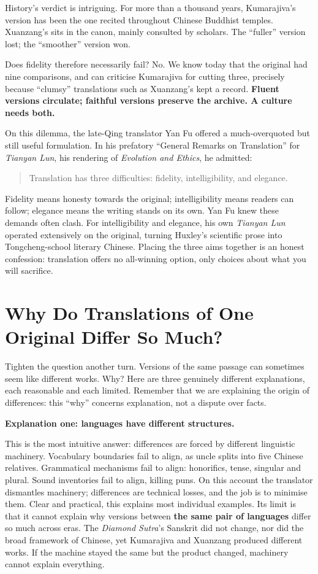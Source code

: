 History's verdict is intriguing. For more than a thousand years, Kumarajiva's version has been the one recited throughout Chinese Buddhist temples. Xuanzang's sits in the canon, mainly consulted by scholars. The ``fuller'' version lost; the ``smoother'' version won.

Does fidelity therefore necessarily fail? No. We know today that the original had nine comparisons, and can criticise Kumarajiva for cutting three, precisely because ``clumsy'' translations such as Xuanzang's kept a record. \textbf{Fluent versions circulate; faithful versions preserve the archive. A culture needs both.}

On this dilemma, the late-Qing translator Yan Fu offered a much-overquoted but still useful formulation. In his prefatory ``General Remarks on Translation'' for \emph{Tianyan Lun}, his rendering of \emph{Evolution and Ethics}, he admitted:

\begin{quote}
Translation has three difficulties: fidelity, intelligibility, and elegance.
\end{quote}
Fidelity means honesty towards the original; intelligibility means readers can follow; elegance means the writing stands on its own. Yan Fu knew these demands often clash. For intelligibility and elegance, his own \emph{Tianyan Lun} operated extensively on the original, turning Huxley's scientific prose into Tongcheng-school literary Chinese. Placing the three aims together is an honest confession: translation offers no all-winning option, only choices about what you will sacrifice.

\section[Why Do Translations Differ?]{Why Do Translations of One Original Differ So Much?}
Tighten the question another turn. Versions of the same passage can sometimes seem like different works. Why? Here are three genuinely different explanations, each reasonable and each limited. Remember that we are explaining the origin of differences: this ``why'' concerns explanation, not a dispute over facts.

\textbf{Explanation one: languages have different structures.}

This is the most intuitive answer: differences are forced by different linguistic machinery. Vocabulary boundaries fail to align, as uncle splits into five Chinese relatives. Grammatical mechanisms fail to align: honorifics, tense, singular and plural. Sound inventories fail to align, killing puns. On this account the translator dismantles machinery; differences are technical losses, and the job is to minimise them. Clear and practical, this explains most individual examples. Its limit is that it cannot explain why versions between \textbf{the same pair of languages} differ so much across eras. The \emph{Diamond Sutra}'s Sanskrit did not change, nor did the broad framework of Chinese, yet Kumarajiva and Xuanzang produced different works. If the machine stayed the same but the product changed, machinery cannot explain everything.

